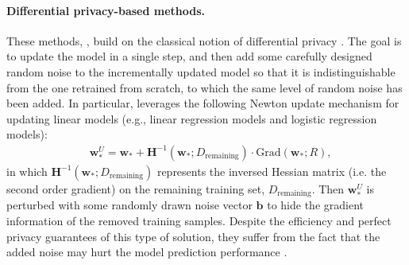 \documentclass[11pt]{article}
\newcommand{\uw}{\textbf{w}^{U}}
\newcommand{\w}{\textbf{w}}
\newcommand{\x}{\textbf{x}}
\newcommand{\bH}{\textbf{H}}
\newcommand{\y}{y}
\begin{document}
\paragraph{Differential privacy-based methods.}
These methods, \cite{guo2020certified,neel2021descent}, build on the classical notion of differential privacy \cite{dwork2014algorithmic}. The goal is to update the model %
in a single step, and then add some carefully designed random noise to the incrementally updated model so that it is indistinguishable from the one retrained from scratch, to which the same level of random noise has been added.
In particular, \cite{guo2020certified} leverages the following Newton update mechanism for updating linear models (e.g., linear regression models and logistic regression models):
\begin{align}\label{eq: newton_update}
    & \uw_* = \w_* + \bH^{-1}(\w_*; D_{\text{remaining}})\cdot\text{Grad}(\w_*;R),
\end{align}
\noindent
in which $\bH^{-1}(\w_*; D_{\text{remaining}})$ represents the inversed Hessian matrix (i.e. the second order gradient) on the remaining training set, $D_{\text{remaining}}$.
Then $\uw_*$ is perturbed with some randomly drawn noise vector $\textbf{b}$ to hide the gradient information of the removed training samples. 
Despite the efficiency and perfect privacy guarantees of this type of solution, they suffer from the fact that the added noise may hurt the model prediction performance \cite{izzo2021approximate, zanella2020analyzing}. 

\end{document}
